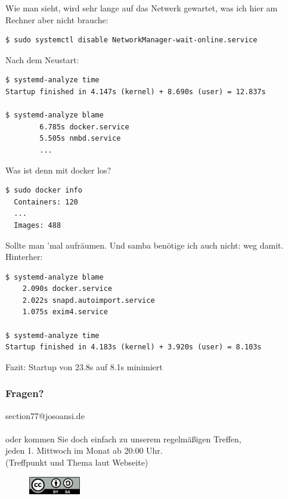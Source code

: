 \begin{frame}[fragile]
Wie man sieht, wird sehr lange auf das Netwerk gewartet, was ich hier am Rechner aber nicht brauche:

\begin{verbatim}
$ sudo systemctl disable NetworkManager-wait-online.service
\end{verbatim}

Nach dem Neustart:
\begin{verbatim}
$ systemd-analyze time
Startup finished in 4.147s (kernel) + 8.690s (user) = 12.837s

$ systemd-analyze blame
        6.785s docker.service
        5.505s nmbd.service
        ...
\end{verbatim}
\end{frame}

\begin{frame}[fragile]
Was ist denn mit docker los?

\begin{verbatim}
$ sudo docker info
  Containers: 120
  ...
  Images: 488
\end{verbatim}

Sollte man 'mal aufräumen. Und samba benötige ich auch nicht: weg damit. Hinterher:

\begin{verbatim}
$ systemd-analyze blame
    2.090s docker.service
    2.022s snapd.autoimport.service
    1.075s exim4.service

$ systemd-analyze time
Startup finished in 4.183s (kernel) + 3.920s (user) = 8.103s
\end{verbatim}

Fazit: Startup von 23.8s auf 8.1s minimiert

\end{frame}

\begin{frame}
\frametitle{Fragen?}
  \begin{center}
  \Large{
    section77@josoansi.de \\~\\

    oder kommen Sie doch einfach zu unserem regelmäßigen Treffen, \\
    jeden 1. Mittwoch im Monat ab 20:00 Uhr. \\
    (Treffpunkt und Thema laut Webseite)
    }
  \end{center}
  \begin{figure}[ht]
    \centering
    \includegraphics[width=0.2\textwidth]{../gemeinsam/CC-BY-SA.png}
  \end{figure}
\end{frame}

